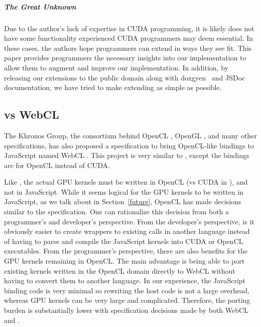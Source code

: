 \subparagraph{The Great Unknown} Due to the author's lack of expertise in CUDA
programming, it is likely \name does not have some functionality experienced
CUDA programmers may deem essential. In these cases, the authors hope
programmers can extend \name in ways they see fit.  This paper provides
programmers the necessary insights into our implementation to allow them to
augment and improve our implementation. In addition, by releasing our extensions
to the public domain along with doxgyen~\cite{doxygen} and JSDoc~\cite{JSDOC}
documentation, we have tried to make extending \name as simple as possible.



\subsection{\name vs WebCL}
\label{webCLDisc}
The Khronos Group, the consortium behind OpenCL
\cite{openCL}, OpenGL \cite{openGL}, and many other specifications, has also
proposed a specification to bring OpenCL-like bindings to JavaScript named WebCL
\cite{webCLSpec}. This project is very similar to \namens, except the bindings are for
OpenCL instead of CUDA.

Like \namens, the actual GPU kernels must be written in OpenCL (vs CUDA in
\namens), and not in JavaScript. While it seems logical for the GPU kernels to
be written in JavaScript, as we talk about in Section~\ref{future}, OpenCL has
made decisions similar to the \name specification. One can rationalize this
decision from both a programmer's and developer's perspective. From the
developer's perspective, is it obviously easier to create wrappers to existing
calls in another language instead of having to parse and compile the JavaScript
kernels into CUDA or OpenCL executables. From the programmer's perspective, there
are also benefits for the GPU kernels remaining in OpenCL. The main advantage is
being able to port existing kernels written in the OpenCL domain directly to
WebCL without having to convert them to another language. In our experience, the
JavaScript binding code is very minimal so rewriting the host code is not a
large overhead, whereas GPU kernels can be very large and complicated.
Therefore, the porting burden is substantially lower with specification
decisions made by both WebCL and \namens.

